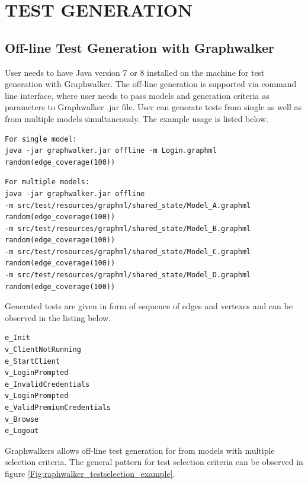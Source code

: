 \chapter{TEST GENERATION}
\label{chapter:test_generation}

\section{Off-line Test Generation with Graphwalker}
\par
User needs to have Java version 7 or 8 installed on the machine for test generation with Graphwalker. The off-line generation is supported via command line interface, where user needs to pass models and generation criteria as parameters to Graphwalker .jar file. User can generate tests from single as well as from multiple models simultaneously. The example usage is listed below.

\begin{lstlisting}
For single model:
java -jar graphwalker.jar offline -m Login.graphml random(edge_coverage(100))
\end{lstlisting}
\begin{lstlisting}
For multiple models:
java -jar graphwalker.jar offline 
-m src/test/resources/graphml/shared_state/Model_A.graphml random(edge_coverage(100)) 
-m src/test/resources/graphml/shared_state/Model_B.graphml random(edge_coverage(100))
-m src/test/resources/graphml/shared_state/Model_C.graphml random(edge_coverage(100))
-m src/test/resources/graphml/shared_state/Model_D.graphml random(edge_coverage(100))
\end{lstlisting}

\par
Generated tests are given in form of sequence of edges and vertexes and can be observed in the listing below.

\begin{lstlisting}
e_Init
v_ClientNotRunning
e_StartClient
v_LoginPrompted
e_InvalidCredentials
v_LoginPrompted
e_ValidPremiumCredentials
v_Browse
e_Logout
\end{lstlisting}

\par
Graphwalkers allows off-line test generation for from models with multiple selection criteria.  The general pattern for test selection criteria can be observed in figure \ref{Fig:raphwalker_testselection_example}.

